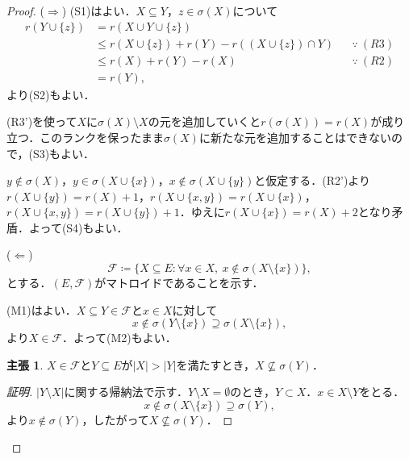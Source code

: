 \documentclass[xelatex,ja=standard,a4paper,14pt,everyparhook=compat]{bxjsarticle}
\theoremstyle{definition}
\newtheorem*{claim}{主張}
\renewcommand{\proofname}{\textup{証明}}
\newenvironment{subproof}[1][\proofname]{%
    \begin{proof}[#1]%
    \renewcommand*{\qedsymbol}{$\blacksquare$}
}{%
    \end{proof}
}
\begin{document}
\begin{proof}
    ($\Longrightarrow$) (S1)はよい．$X \subseteq Y$，$z \in \sigma(X)$について \begin{align*}
        r(Y \cup \{z\})
         & = r(X \cup Y \cup \{z\})                                                    \\
         & \leq r(X \cup \{z\}) + r(Y) - r((X \cup \{z\}) \cap Y) &  & \because \ (R3) \\
         & \leq r(X) + r(Y) - r(X)                                &  & \because \ (R2) \\
         & = r(Y),
    \end{align*}
    より(S2)もよい．

    (R3')を使って$X$に$\sigma(X) \setminus X$の元を追加していくと$r(\sigma(X)) = r(X)$が成り立つ．このランクを保ったまま$\sigma(X)$に新たな元を追加することはできないので，(S3)もよい．

    $y \notin \sigma(X)$，$y \in \sigma(X \cup \{x\})$，$x \notin \sigma(X \cup \{y\})$と仮定する．(R2')より$r(X \cup \{y\}) = r(X) + 1$，$r(X \cup \{x, y\}) = r(X \cup \{x\})$，$r(X \cup \{x, y\}) = r(X \cup \{y\}) + 1$．ゆえに$r(X \cup \{x\}) = r(X) + 2$となり矛盾．よって(S4)もよい．

    \newpage

    ($\Longleftarrow$) \begin{equation*}
        \mathcal{F} \coloneqq \{X \subseteq E : \forall x \in X, \ x \notin \sigma(X \setminus \{x\})\},
    \end{equation*}
    とする．$(E, \mathcal{F})$がマトロイドであることを示す．

    (M1)はよい．$X \subseteq Y \in \mathcal{F}$と$x \in X$に対して \begin{equation*}
        x \notin \sigma(Y \setminus \{x\}) \supseteq \sigma(X \setminus \{x\}),
    \end{equation*}
    より$X \in \mathcal{F}$．よって(M2)もよい．

    \begin{claim}
        $X \in \mathcal{F}$と$Y \subseteq E$が$|X| > |Y|$を満たすとき，$X \not\subseteq \sigma(Y)$．
    \end{claim}
    \begin{subproof}
        $|Y \setminus X|$に関する帰納法で示す．$Y \setminus X = \emptyset$のとき，$Y \subset X$．$x \in X \setminus Y$をとる．\begin{equation*}
            x \notin \sigma(X \setminus \{x\}) \supseteq \sigma(Y),
        \end{equation*}
        より$x \notin \sigma(Y)$，したがって$X \not\subseteq \sigma(Y)$．


\end{subproof}
\end{proof}
\end{document}
